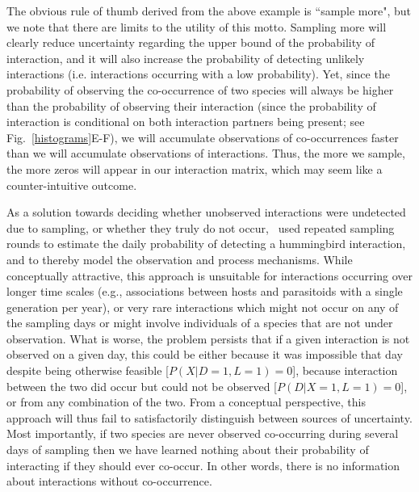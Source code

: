 \documentclass[12pt]{article}
\begin{document}
  The obvious rule of thumb derived from the above example is ``sample more", but we note that there are limits to the utility of this motto. Sampling more will clearly reduce uncertainty regarding the upper bound of the probability of interaction, and it will also increase the probability of detecting unlikely interactions (i.e. interactions occurring with a low probability). Yet, since the probability of observing the co-occurrence of two species will always be higher than the probability of observing their interaction (since the probability of interaction is conditional on both interaction partners being present; see Fig.~\ref{histograms}E-F), we will accumulate observations of co-occurrences faster than we will accumulate observations of interactions. Thus, the more we sample, the more zeros will appear in our interaction matrix, which may seem like a counter-intuitive outcome. 


  As a solution towards deciding whether unobserved interactions were undetected due to sampling, or whether they truly do not occur,~\citet{Weinstein2017} used repeated sampling rounds to estimate the daily probability of detecting a hummingbird interaction, and to thereby model the observation and process mechanisms. While conceptually attractive, this approach is unsuitable for interactions occurring over longer time scales (e.g., associations between hosts and parasitoids with a single generation per year), or very rare interactions which might not occur on any of the sampling days or might involve individuals of a species that are not under observation. What is worse, the problem persists that if a given interaction is not observed on a given day, this could be either because it was impossible that day despite being otherwise feasible [$P(X|D=1,L=1)=0$], because interaction between the two did occur but could not be observed [$P(D|X=1,L=1)=0$], or from any combination of the two. From a conceptual perspective, this approach will thus fail to satisfactorily distinguish between sources of uncertainty. Most importantly, if two species are never observed co-occurring during several days of sampling then we have learned nothing about their probability of interacting if they should ever co-occur. In other words, there is no information about interactions without co-occurrence.
\end{document}
